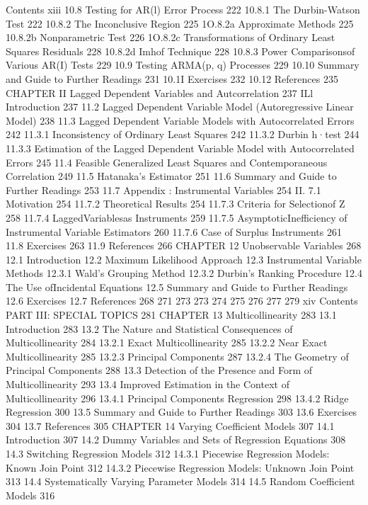 {Contents xiii
10.8 Testing for AR(l) Error Process 222
10.8.1 The Durbin-Watson Test 222
10.8.2 The Inconclusive Region 225
1O.8.2a Approximate Methods 225
10.8.2b Nonparametric Test 226
1O.8.2c Transformations of Ordinary Least Squares Residuals 228
10.8.2d Imhof Technique 228
10.8.3 Power Comparisonsof Various AR(I) Tests 229
10.9 Testing ARMA(p, q) Processes 229
10.10 Summary and Guide to Further Readings 231
10.1I Exercises 232
10.12 References 235
CHAPTER II
Lagged Dependent Variables and Autcorrelation 237
ILl Introduction 237
11.2 Lagged Dependent Variable Model (Autoregressive Linear Model) 238
11.3 Lagged Dependent Variable Models with Autocorrelated Errors 242
11.3.1 Inconsistency of Ordinary Least Squares 242
11.3.2 Durbin h·test 244
11.3.3 Estimation of the Lagged Dependent Variable Model with
Autocorrelated Errors 245
11.4 Feasible Generalized Least Squares and Contemporaneous Correlation 249
11.5 Hatanaka's Estimator 251
11.6 Summary and Guide to Further Readings 253
11.7 Appendix : Instrumental Variables 254
II. 7.1 Motivation 254
11.7.2 Theoretical Results 254
11.7.3 Criteria for Selectionof Z 258
11.7.4 LaggedVariablesas Instruments 259
11.7.5 AsymptoticInefficiency of Instrumental Variable Estimators 260
11.7.6 Case of Surplus Instruments 261
11.8 Exercises 263
11.9 References 266
CHAPTER 12
Unobservable Variables 268
12.1 Introduction
12.2 Maximum Likelihood Approach
12.3 Instrumental Variable Methods
12.3.1 Wald's Grouping Method
12.3.2 Durbin's Ranking Procedure
12.4 The Use ofIncidental Equations
12.5 Summary and Guide to Further Readings
12.6 Exercises
12.7 References
268
271
273
273
274
275
276
277
279
xiv Contents
PART III: SPECIAL TOPICS 281
CHAPTER 13
Multicollinearity 283
13.1 Introduction 283
13.2 The Nature and Statistical Consequences of Multicollinearity 284
13.2.1 Exact Multicollinearity 285
13.2.2 Near Exact Multicollinearity 285
13.2.3 Principal Components 287
13.2.4 The Geometry of Principal Components 288
13.3 Detection of the Presence and Form of Multicollinearity 293
13.4 Improved Estimation in the Context of Multicollinearity 296
13.4.1 Principal Components Regression 298
13.4.2 Ridge Regression 300
13.5 Summary and Guide to Further Readings 303
13.6 Exercises 304
13.7 References 305
CHAPTER 14
Varying Coefficient Models 307
14.1 Introduction 307
14.2 Dummy Variables and Sets of Regression Equations 308
14.3 Switching Regression Models 312
14.3.1 Piecewise Regression Models: Known Join Point 312
14.3.2 Piecewise Regression Models: Unknown Join Point 313
14.4 Systematically Varying Parameter Models 314
14.5 Random Coefficient Models 316
}
